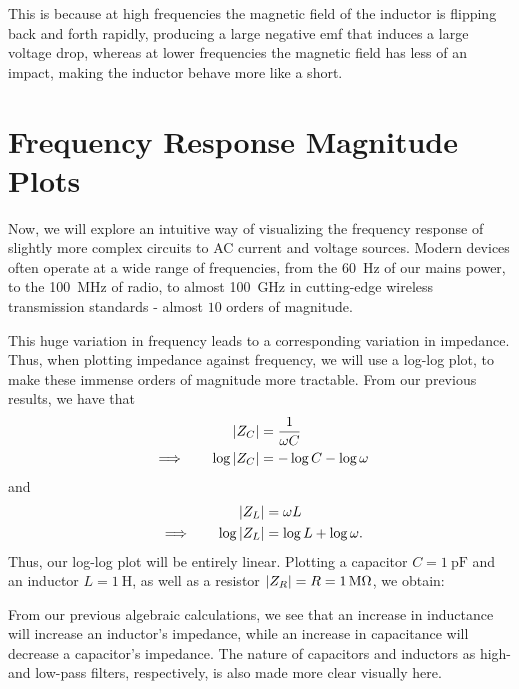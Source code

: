 \documentclass[letterpaper]{article}
\theoremstyle{remark}
\DeclarePairedDelimiter\abs{\lvert}{\rvert}%
\newcommand{\eqn}[1]{\begin{alignat*}{2}#1\end{alignat*}}
\newcommand*{\thus}{&\implies\quad&}
\begin{document}
This is because at high frequencies the magnetic field of the inductor is flipping back and forth rapidly, producing a large negative emf that induces a large voltage drop, whereas at lower frequencies the magnetic field has less of an impact, making the inductor behave more like a short.

\section{Frequency Response Magnitude Plots}
Now, we will explore an intuitive way of visualizing the frequency response of slightly more complex circuits to AC current and voltage sources. Modern devices often operate at a wide range of frequencies, from the \SI{60}{\hertz} of our mains power, to the \SI{100}{\mega\hertz} of radio, to almost \SI{100}{\giga\hertz} in cutting-edge wireless transmission standards - almost $10$ orders of magnitude. 

This huge variation in frequency leads to a corresponding variation in impedance. Thus, when plotting impedance against frequency, we will use a log-log plot, to make these immense orders of magnitude more tractable. From our previous results, we have that
\eqn{
    && \abs{Z_C} &= \frac{1}{\omega C} \\
    \thus \log{\abs{Z_C}} &= -\log{C} - \log{\omega}
}
and
\eqn{
    && \abs{Z_L} &= \omega L \\
    \thus \log{\abs{Z_L}} &= \log{L} + \log{\omega}.
}
Thus, our log-log plot will be entirely linear. Plotting a capacitor $C = \SI{1}{\pico\farad}$ and an inductor $L = \SI{1}{\henry}$, as well as a resistor $\abs{Z_R} = R = \SI{1}{\mega\ohm}$, we obtain:
\begin{center}
\end{center}
From our previous algebraic calculations, we see that an increase in inductance will increase an inductor's impedance, while an increase in capacitance will decrease a capacitor's impedance. The nature of capacitors and inductors as high- and low-pass filters, respectively, is also made more clear visually here.
\end{document}
